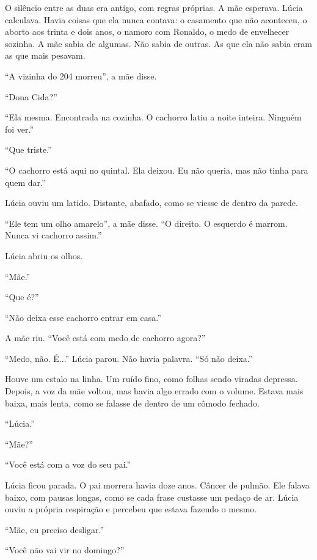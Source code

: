 \noindent O silêncio entre as duas era antigo, com regras próprias. A mãe esperava. Lúcia calculava. Havia coisas que ela nunca contava: o casamento que não aconteceu, o aborto aos trinta e dois anos, o namoro com Ronaldo, o medo de envelhecer sozinha. A mãe sabia de algumas. Não sabia de outras. As que ela não sabia eram as que mais pesavam.

\noindent ``A vizinha do 204 morreu'', a mãe disse.

\noindent ``Dona Cida?''

\noindent ``Ela mesma. Encontrada na cozinha. O cachorro latiu a noite inteira. Ninguém foi ver.''

\noindent ``Que triste.''

\noindent ``O cachorro está aqui no quintal. Ela deixou. Eu não queria, mas não tinha para quem dar.''

\noindent Lúcia ouviu um latido. Distante, abafado, como se viesse de dentro da parede.

\noindent ``Ele tem um olho amarelo'', a mãe disse. ``O direito. O esquerdo é marrom. Nunca vi cachorro assim.''

\noindent Lúcia abriu os olhos.

\noindent ``Mãe.''

\noindent ``Que é?''

\noindent ``Não deixa esse cachorro entrar em casa.''

\noindent A mãe riu. ``Você está com medo de cachorro agora?''

\noindent ``Medo, não. É...'' Lúcia parou. Não havia palavra. ``Só não deixa.''

\noindent Houve um estalo na linha. Um ruído fino, como folhas sendo viradas depressa. Depois, a voz da mãe voltou, mas havia algo errado com o volume. Estava mais baixa, mais lenta, como se falasse de dentro de um cômodo fechado.

\noindent ``Lúcia.''

\noindent ``Mãe?''

\noindent ``Você está com a voz do seu pai.''

\noindent Lúcia ficou parada. O pai morrera havia doze anos. Câncer de pulmão. Ele falava baixo, com pausas longas, como se cada frase custasse um pedaço de ar. Lúcia ouviu a própria respiração e percebeu que estava fazendo o mesmo.

\noindent ``Mãe, eu preciso desligar.''

\noindent ``Você não vai vir no domingo?''

